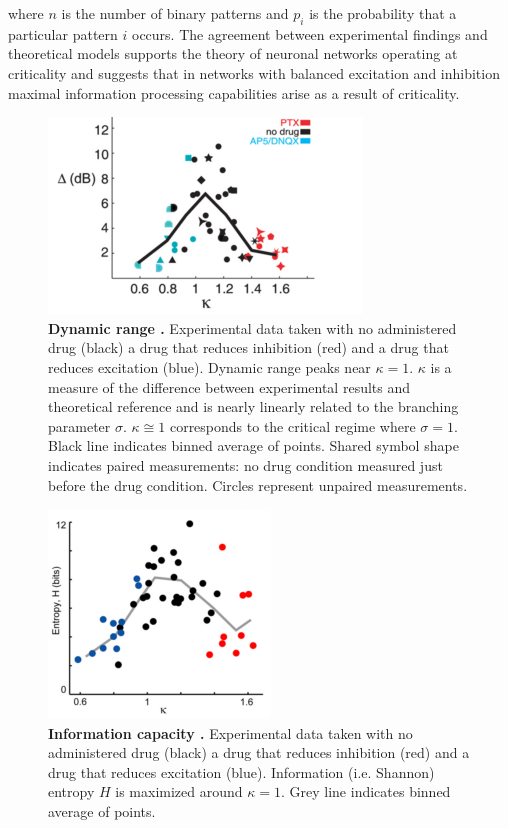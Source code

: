 \documentclass[12pt]{article}
\begin{document}
\noindent where $n$ is the number of binary patterns and $ p_{i} $ is the probability that a particular pattern $i$ occurs. The agreement between experimental findings and theoretical models supports the theory of neuronal networks operating at criticality and suggests that in networks with balanced excitation and inhibition maximal information processing capabilities arise as a result of criticality. 

\begin{figure}      
  \begin{center}    
 \includegraphics[width=.6\textwidth]{dynamicrangeexpplenz}    
    \caption{\textbf{Dynamic range \cite{Shew2009b}.} Experimental data taken with no administered drug (black) a drug that reduces inhibition (red) and a drug that reduces excitation (blue). Dynamic range peaks near $\kappa = 1$. $\kappa$ is a measure of the difference between experimental results and theoretical reference and is nearly linearly related to the branching parameter $\sigma$. $\kappa \cong 1$ corresponds to the critical regime where $\sigma = 1$. Black line indicates binned average of points. Shared symbol shape indicates paired measurements: no drug condition measured just before the drug condition. Circles represent unpaired measurements.}
    
   \label{Figure::Dynamic Range Experiment}   
  \end{center}     
   \end{figure}
  
\begin{figure}      
  \begin{center}    
 \includegraphics[width=.45\textwidth]{entropyplenz}    
    \caption{\textbf{Information capacity \cite{Shew2011a}.} Experimental data taken with no administered drug (black) a drug that reduces inhibition (red) and a drug that reduces excitation (blue). Information (i.e. Shannon) entropy $H$ is maximized around $\kappa = 1$. Grey line indicates binned average of points.}
   \label{Figure::Entropy / information maximized experimental}   
  \end{center}     
   \end{figure}
\end{document}
